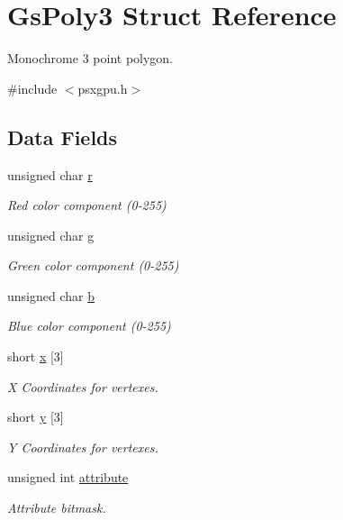 \hypertarget{structGsPoly3}{}\section{Gs\+Poly3 Struct Reference}
\label{structGsPoly3}


Monochrome 3 point polygon.  




{\ttfamily \#include $<$psxgpu.\+h$>$}

\subsection*{Data Fields}
\begin{DoxyCompactItemize}
\item 
unsigned char \hyperlink{structGsPoly3_ad6e5d6f90f65bb68d79afcc618aa0561}{r}
\begin{DoxyCompactList}\small\item\em Red color component (0-\/255) \end{DoxyCompactList}\item 
unsigned char \hyperlink{structGsPoly3_a22f16d37acb1952cac431d182640383a}{g}
\begin{DoxyCompactList}\small\item\em Green color component (0-\/255) \end{DoxyCompactList}\item 
unsigned char \hyperlink{structGsPoly3_a5fd31be0e0f4318c79eba5f6b0fbf407}{b}
\begin{DoxyCompactList}\small\item\em Blue color component (0-\/255) \end{DoxyCompactList}\item 
short \hyperlink{structGsPoly3_afb69db87ee5f1fd299a9aaeb14f55d2d}{x} \mbox{[}3\mbox{]}
\begin{DoxyCompactList}\small\item\em X Coordinates for vertexes. \end{DoxyCompactList}\item 
short \hyperlink{structGsPoly3_ab05b0a5a5e8d5bccfd03b5e1f15668a2}{y} \mbox{[}3\mbox{]}
\begin{DoxyCompactList}\small\item\em Y Coordinates for vertexes. \end{DoxyCompactList}\item 
unsigned int \hyperlink{structGsPoly3_af984f057fe145257779d682611a506ca}{attribute}
\begin{DoxyCompactList}\small\item\em Attribute bitmask. \end{DoxyCompactList}\end{DoxyCompactItemize}



